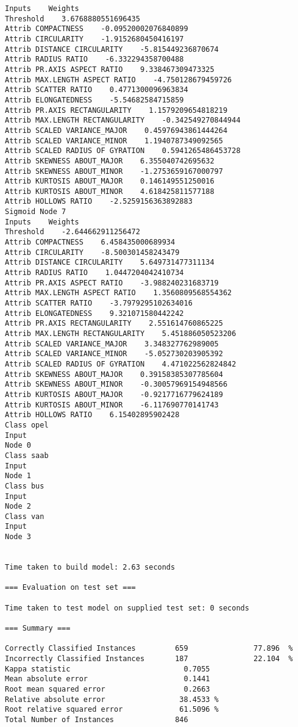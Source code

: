 \documentclass[
	article,			%
	11pt,				%
	oneside,			%
	a4paper,			%
	english,			%
	brazil,				%
	sumario=tradicional
	]{abntex2}
\begin{document}
\begin{lstlisting}
Inputs    Weights
Threshold    3.6768880551696435
Attrib COMPACTNESS    -0.09520002076840899
Attrib CIRCULARITY    -1.9152680450416197
Attrib DISTANCE CIRCULARITY    -5.815449236870674
Attrib RADIUS RATIO    -6.332294358700488
Attrib PR.AXIS ASPECT RATIO    9.338467309473325
Attrib MAX.LENGTH ASPECT RATIO    -4.750128679459726
Attrib SCATTER RATIO    0.4771300096963834
Attrib ELONGATEDNESS    -5.54682584715859
Attrib PR.AXIS RECTANGULARITY    1.1579209654818219
Attrib MAX.LENGTH RECTANGULARITY    -0.342549270844944
Attrib SCALED VARIANCE_MAJOR    0.45976943861444264
Attrib SCALED VARIANCE_MINOR    1.1940787349092565
Attrib SCALED RADIUS OF GYRATION    0.5941265486453728
Attrib SKEWNESS ABOUT_MAJOR    6.355040742695632
Attrib SKEWNESS ABOUT_MINOR    -1.2753659167000797
Attrib KURTOSIS ABOUT_MAJOR    0.146149551250016
Attrib KURTOSIS ABOUT_MINOR    4.618425811577188
Attrib HOLLOWS RATIO    -2.5259156363892883
Sigmoid Node 7
Inputs    Weights
Threshold    -2.644662911256472
Attrib COMPACTNESS    6.458435000689934
Attrib CIRCULARITY    -8.500301458243479
Attrib DISTANCE CIRCULARITY    5.649731477311134
Attrib RADIUS RATIO    1.0447204042410734
Attrib PR.AXIS ASPECT RATIO    -3.988240231683719
Attrib MAX.LENGTH ASPECT RATIO    1.3560809568554362
Attrib SCATTER RATIO    -3.7979295102634016
Attrib ELONGATEDNESS    9.321071580442242
Attrib PR.AXIS RECTANGULARITY    2.551614760865225
Attrib MAX.LENGTH RECTANGULARITY    5.451886050523206
Attrib SCALED VARIANCE_MAJOR    3.348327762989005
Attrib SCALED VARIANCE_MINOR    -5.052730203905392
Attrib SCALED RADIUS OF GYRATION    4.471022562824842
Attrib SKEWNESS ABOUT_MAJOR    0.39158385307785604
Attrib SKEWNESS ABOUT_MINOR    -0.30057969154948566
Attrib KURTOSIS ABOUT_MAJOR    -0.9217716779624189
Attrib KURTOSIS ABOUT_MINOR    -6.117690770141743
Attrib HOLLOWS RATIO    6.15402895902428
Class opel
Input
Node 0
Class saab
Input
Node 1
Class bus
Input
Node 2
Class van
Input
Node 3


Time taken to build model: 2.63 seconds

=== Evaluation on test set ===

Time taken to test model on supplied test set: 0 seconds

=== Summary ===

Correctly Classified Instances         659               77.896  %
Incorrectly Classified Instances       187               22.104  %
Kappa statistic                          0.7055
Mean absolute error                      0.1441
Root mean squared error                  0.2663
Relative absolute error                 38.4533 %
Root relative squared error             61.5096 %
Total Number of Instances              846     


\end{lstlisting}
\end{document}
